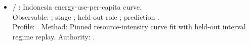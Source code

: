 \begin{itemize}
\item {} / : Indonesia energy-use-per-capita curve.\\ Observable: ; stage ; held-out role ; prediction .\\ Profile: . Method: Pinned resource-intensity curve fit with held-out interval regime replay. Authority: .
\end{itemize}

\endgroup
